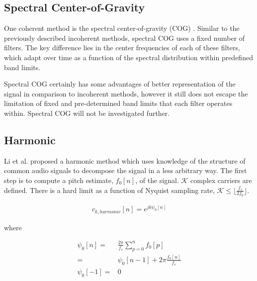 \documentclass [11pt, proquest,oneside] {ganter_thesis}[2015/03/03]
\begin{document}


\subsection{Spectral Center-of-Gravity}

One coherent method is the spectral center-of-gravity (COG) \cite{clark2009time}.  Similar to the previously described incoherent methods, spectral COG uses a fixed number of filters.  The key difference lies in the center frequencies of each of these filters, which adapt over time as a function of the spectral distribution within predefined band limits.

Spectral COG certainly has some advantages of better representation of the signal in comparison to incoherent methods, however it still does not escape the limitation of fixed and pre-determined band limits that each filter operates within.  Spectral COG will not be investigated further.

\subsection{Harmonic}

Li et al. \cite{li2010harmonic} proposed a harmonic method which uses knowledge of the structure of common audio signals to decompose the signal in a less arbitrary way.  The first step is to compute a pitch estimate, $f_0[n]$, of the signal.  $\mathcal{K}$ complex carriers are defined.  There is a hard limit as a function of Nyquist sampling rate, $\mathcal{K} \leq  \Big\lfloor \frac{f_s}{2f_0} \Big\rfloor$.

\begin{align}
c_{k,harmonic}[n] = e^{jk\psi_0 [n]}
\end{align}

where

\begin{align}
\psi_0[n] =& \frac{2\pi}{f_s} \sum_{p=0}^{n} f_0[p] \nonumber \\
\label{eq:harmonic_phi0}
=& \psi_0[n - 1] + 2\pi \frac{f_0[n]}{f_s} \\
\psi_0[-1] =& 0 \nonumber
\end{align}
\end{document}
